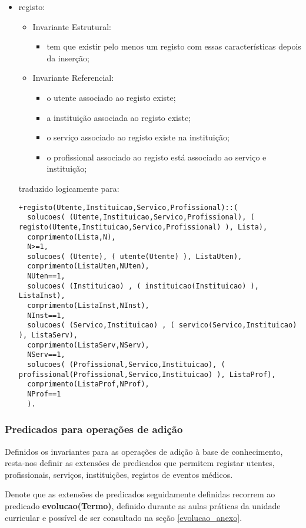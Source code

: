 \documentclass[
  oneside,
  10pt, a4paper,
  footinclude=true,
  headinclude=true,
  cleardoublepage=empty
]{scrbook}
\begin{document}
\begin{itemize}
\item   registo:
\begin{itemize}
\item        Invariante Estrutural:
\begin{itemize}
\item         tem que existir pelo menos um registo com essas características depois da inserção;
\end{itemize}
\item        Invariante Referencial:
\begin{itemize}
\item         o utente associado ao registo existe;
\item 	a instituição associada ao registo existe;
\item         o serviço associado ao registo existe na instituição;
\item 	o profissional associado ao registo está associado ao serviço e instituição;
\end{itemize}
\end{itemize}
traduzido logicamente para:
\begin{lstlisting}
+registo(Utente,Instituicao,Servico,Profissional)::(
  solucoes( (Utente,Instituicao,Servico,Profissional), ( registo(Utente,Instituicao,Servico,Profissional) ), Lista),
  comprimento(Lista,N),
  N>=1,
  solucoes( (Utente), ( utente(Utente) ), ListaUten),
  comprimento(ListaUten,NUten),
  NUten==1,
  solucoes( (Instituicao) , ( instituicao(Instituicao) ), ListaInst),
  comprimento(ListaInst,NInst),
  NInst==1,
  solucoes( (Servico,Instituicao) , ( servico(Servico,Instituicao) ), ListaServ),
  comprimento(ListaServ,NServ),
  NServ==1,
  solucoes( (Profissional,Servico,Instituicao), ( profissional(Profissional,Servico,Instituicao) ), ListaProf),
  comprimento(ListaProf,NProf),
  NProf==1
  ).
\end{lstlisting}

\end{itemize}
\subsubsection{Predicados para operações de adição}
Definidos os invariantes para as operações de adição à base de conhecimento, resta-nos definir as extensões de predicados que permitem registar utentes, profissionais, serviços, instituições, registos de eventos médicos.\par
Denote que as extensões de predicados seguidamente definidas recorrem ao predicado \textbf{evolucao(Termo)}, definido durante as aulas práticas da unidade curricular e possível de ser consultado na seção \ref{evolucao_anexo}.
\end{document}
